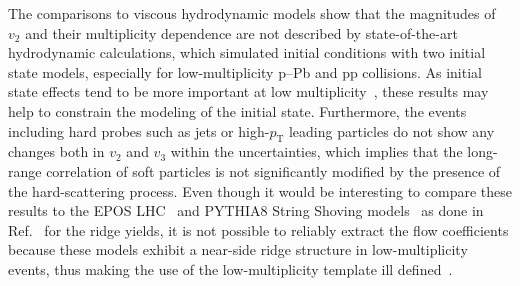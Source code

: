 The comparisons to viscous hydrodynamic models show that the magnitudes of $v_2$ and their multiplicity dependence are not described by state-of-the-art hydrodynamic calculations, which simulated initial conditions with two initial state models, especially for low-multiplicity p--Pb and pp collisions. As initial state effects tend to be more important at low multiplicity~\cite{Greif:2017bnr,Moreland:2018gsh}, these results may help to constrain the modeling of the initial state.
Furthermore, the events including hard probes such as jets or high-$p_\mathrm{T}$ leading particles do not show any changes both in $v_2$ and $v_3$ within the uncertainties, which implies that the long-range correlation of soft particles is not significantly modified by the presence of the hard-scattering process. Even though it would be interesting to compare these results to the EPOS LHC~\cite{Pierog:2013ria} and PYTHIA8 String Shoving models~\cite{Bierlich:2017vhg,Bierlich:2019ixq} as done in Ref.~\cite{ALICE:2012eyl} for the ridge yields, it is not possible to reliably extract the flow coefficients because these models exhibit a near-side ridge structure in low-multiplicity events, thus making the use of the low-multiplicity template ill defined~\cite{Ji:2023eqn}.

